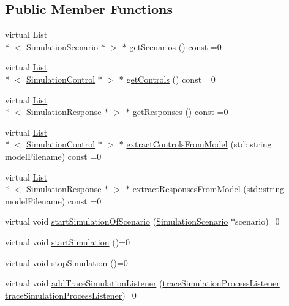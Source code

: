 \subsection*{Public Member Functions}
\begin{DoxyCompactItemize}
\item 
virtual \hyperlink{class_list}{List}\\*
$<$ \hyperlink{class_simulation_scenario}{Simulation\-Scenario} $\ast$ $>$ $\ast$ \hyperlink{class_process_analyser__if_a4cec163a7fc994f7d2cc5d642d3f9b84}{get\-Scenarios} () const =0
\item 
virtual \hyperlink{class_list}{List}\\*
$<$ \hyperlink{class_simulation_control}{Simulation\-Control} $\ast$ $>$ $\ast$ \hyperlink{class_process_analyser__if_a639a16af5f2ad52e63fce4dc751c9fd4}{get\-Controls} () const =0
\item 
virtual \hyperlink{class_list}{List}\\*
$<$ \hyperlink{class_simulation_response}{Simulation\-Response} $\ast$ $>$ $\ast$ \hyperlink{class_process_analyser__if_ab434ec8f01acb7730557f3ff9a460798}{get\-Responses} () const =0
\item 
virtual \hyperlink{class_list}{List}\\*
$<$ \hyperlink{class_simulation_control}{Simulation\-Control} $\ast$ $>$ $\ast$ \hyperlink{class_process_analyser__if_a27b1e534ff72b8faecc28ae7419dd588}{extract\-Controls\-From\-Model} (std\-::string model\-Filename) const =0
\item 
virtual \hyperlink{class_list}{List}\\*
$<$ \hyperlink{class_simulation_response}{Simulation\-Response} $\ast$ $>$ $\ast$ \hyperlink{class_process_analyser__if_a0a13770b90d56f44fe89e4a2e940800e}{extract\-Responses\-From\-Model} (std\-::string model\-Filename) const =0
\item 
virtual void \hyperlink{class_process_analyser__if_a55396a5eb2eebc928eb7681d1f8f87ea}{start\-Simulation\-Of\-Scenario} (\hyperlink{class_simulation_scenario}{Simulation\-Scenario} $\ast$scenario)=0
\item 
virtual void \hyperlink{class_process_analyser__if_ad0949759ce49af24bba3e8875b164675}{start\-Simulation} ()=0
\item 
virtual void \hyperlink{class_process_analyser__if_aeb292cf1587fda460b9d551bfc65c6e4}{stop\-Simulation} ()=0
\item 
virtual void \hyperlink{class_process_analyser__if_abdbb0685841e8366507f77a6884451c3}{add\-Trace\-Simulation\-Listener} (\hyperlink{_listener_8h_a8f5a30615774c5ee0b5c5f86741e4b6f}{trace\-Simulation\-Process\-Listener} \hyperlink{_listener_8h_a8f5a30615774c5ee0b5c5f86741e4b6f}{trace\-Simulation\-Process\-Listener})=0
\end{DoxyCompactItemize}


